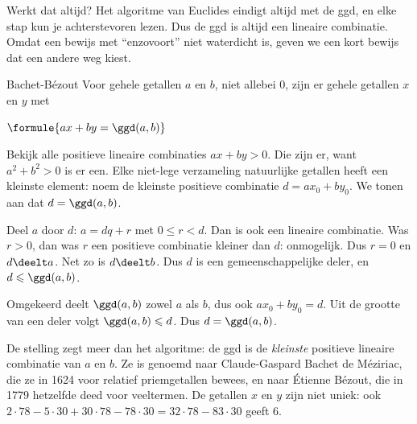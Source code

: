 Werkt dat altijd? Het algoritme van Euclides eindigt altijd met de ggd, en elke stap kun je achterstevoren lezen. Dus de ggd is altijd een lineaire combinatie. Omdat een bewijs met ``enzovoort'' niet waterdicht is, geven we een kort bewijs dat een andere weg kiest.

\begin{theorie}
\begin{stelling}{Bachet-Bézout}
Voor gehele getallen $a$ en $b$, niet allebei 0, zijn er gehele getallen $x$ en $y$ met

\vspace{1mm}
\qquad $\formule{ax + by = \ggd(a, b)}$
\end{stelling}

\begin{bewijs}
Bekijk alle positieve lineaire combinaties $ax + by > 0$. Die zijn er, want $a^2 + b^2 > 0$ is er een. Elke niet-lege verzameling natuurlijke getallen heeft een kleinste element: noem de kleinste positieve combinatie $d = ax_0 + by_0$. We tonen aan dat $d = \ggd(a, b)$.

Deel $a$ door $d$: $a = dq + r$ met $0 \leqslant r < d$. Dan is
ook een lineaire combinatie. Was $r > 0$, dan was $r$ een positieve combinatie kleiner dan $d$: onmogelijk. Dus $r = 0$ en $d \deelt a$. Net zo is $d \deelt b$. Dus $d$ is een gemeenschappelijke deler, en $d \leqslant \ggd(a, b)$.

Omgekeerd deelt $\ggd(a, b)$ zowel $a$ als $b$, dus ook $ax_0 + by_0 = d$. Uit de grootte van een deler volgt $\ggd(a, b) \leqslant d$. Dus $d = \ggd(a, b)$.
\end{bewijs}
\end{theorie}

De stelling zegt meer dan het algoritme: de ggd is de \textit{kleinste} positieve lineaire combinatie van $a$ en $b$. Ze is genoemd naar Claude-Gaspard Bachet de Méziriac, die ze in 1624 voor relatief priemgetallen bewees, en naar Étienne Bézout, die in 1779 hetzelfde deed voor veeltermen. De getallen $x$ en $y$ zijn niet uniek: ook $2 \cdot 78 - 5 \cdot 30 + 30 \cdot 78 - 78 \cdot 30 = 32 \cdot 78 - 83 \cdot 30$ geeft 6.


